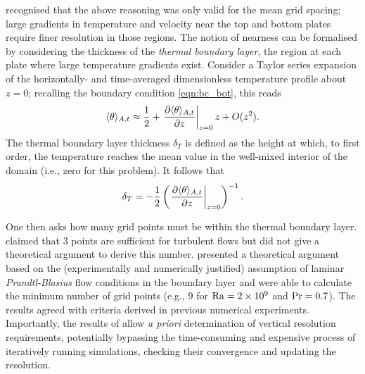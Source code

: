 \documentclass[../main.tex]{subfiles}
\begin{document}
\citeauthor{grotzbach1983} recognised that the above reasoning was only valid
for the mean grid spacing; large gradients in temperature and velocity near the
top and bottom plates require finer resolution in those regions. The notion of
nearness can be formalised by considering the thickness of the \emph{thermal
boundary layer}, the region at each plate where large temperature gradients
exist. Consider a Taylor series expansion of the horizontally- and
time-averaged dimensionless temperature profile about $z=0$; recalling the
boundary condition \cref{eqn:bc_bot}, this reads
\[
    \langle \theta \rangle_{A,t} \approx \frac{1}{2}
        + \left. \frac{\partial \langle \theta \rangle_{A,t}}{\partial z} \right|_{z=0} z
        + O(z^2).
\]
The thermal boundary layer thickness $\delta_T$ is defined \parencite[see,
e.g.,][]{chilla2012} as the height at which, to first order, the temperature
reaches the mean value in the well-mixed interior of the domain (i.e., zero for
this problem). It follows that
\begin{equation}
    \label{eqn:thermal_bl}
    \delta_T = -\frac{1}{2} \left(
        \left. \frac{\partial \langle \theta \rangle_{A,t}}{\partial z} \right|_{z=0}
    \right)^{-1}.
\end{equation}

One then asks how many grid points must be within the thermal boundary layer.
\citeauthor{grotzbach1983} claimed that 3 points are sufficient for turbulent
flows but did not give a theoretical argument to derive this number.
\textcite{shishkina2010} presented a theoretical argument based on the
(experimentally and numerically justified) assumption of laminar
\emph{Prandtl-Blasius} flow conditions in the boundary layer and were able to
calculate the minimum number of grid points (e.g., 9 for $\mathrm{Ra} =
\SI{2e9}{}$ and $\mathrm{Pr} = 0.7$). The results agreed with criteria derived in
previous numerical experiments. Importantly, the results of
\citeauthor{shishkina2010} allow \emph{a priori} determination of vertical
resolution requirements, potentially bypassing the time-consuming and expensive
process of iteratively running simulations, checking their convergence and
updating the resolution.
\end{document}
